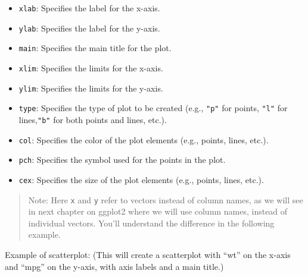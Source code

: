\documentclass[
]{book}
\newenvironment{Shaded}{\begin{snugshade}}{\end{snugshade}}
\newcommand{\AttributeTok}[1]{\textcolor[rgb]{0.13,0.29,0.53}{#1}}
\newcommand{\FunctionTok}[1]{\textcolor[rgb]{0.13,0.29,0.53}{\textbf{#1}}}
\newcommand{\NormalTok}[1]{#1}
\newcommand{\SpecialCharTok}[1]{\textcolor[rgb]{0.81,0.36,0.00}{\textbf{#1}}}
\newcommand{\StringTok}[1]{\textcolor[rgb]{0.31,0.60,0.02}{#1}}
\providecommand{\tightlist}{%
  \setlength{\itemsep}{0pt}\setlength{\parskip}{0pt}}
\begin{document}
\begin{itemize}
\tightlist
\item
  \texttt{xlab}: Specifies the label for the x-axis.
\item
  \texttt{ylab}: Specifies the label for the y-axis.
\item
  \texttt{main}: Specifies the main title for the plot.
\item
  \texttt{xlim}: Specifies the limits for the x-axis.
\item
  \texttt{ylim}: Specifies the limits for the y-axis.
\item
  \texttt{type}: Specifies the type of plot to be created (e.g., \texttt{"p"} for points, \texttt{"l"} for lines,\texttt{"b"} for both points and lines, etc.).
\item
  \texttt{col}: Specifies the color of the plot elements (e.g., points, lines, etc.).
\item
  \texttt{pch}: Specifies the symbol used for the points in the plot.
\item
  \texttt{cex}: Specifies the size of the plot elements (e.g., points, lines, etc.).
\end{itemize}

\begin{quote}
Note: Here \texttt{x} and \texttt{y} refer to vectors instead of column names, as we will see in next chapter on ggplot2 where we will use column names, instead of individual vectors. You'll understand the difference in the following example.
\end{quote}

Example of scatterplot: (This will create a scatterplot with ``wt'' on the x-axis and ``mpg'' on the y-axis, with axis labels and a main title.)

\begin{Shaded}
\end{Shaded}
\end{document}

